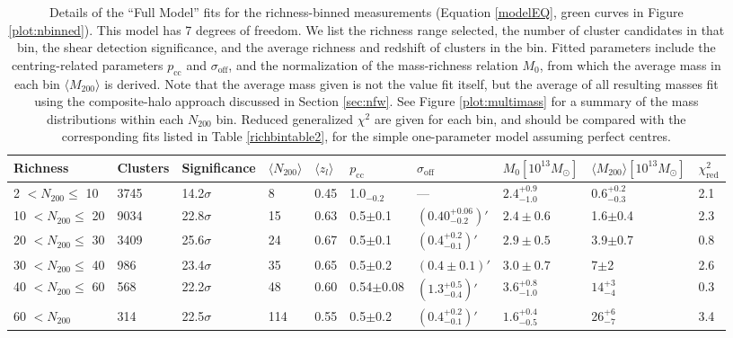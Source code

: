 \begin{landscape}

\begin{table}
\centering
    \caption[Shear Results for Richness-Binned Clusters (Full Model)]{Details of the ``Full Model'' fits for the richness-binned measurements (Equation \ref{modelEQ}, green curves in Figure \ref{plot:nbinned}). This model has 7 degrees of freedom. We list the richness range selected, the number of cluster candidates in that bin, the shear detection significance, and the average richness and redshift of clusters in the bin. Fitted parameters include the centring-related parameters $p_{\mathrm{cc}}$ and $\sigma_{\mathrm{off}}$, and the normalization of the mass-richness relation $M_0$, from which the average mass in each bin $\langle M_{200} \rangle$ is derived. Note that the average mass given is not the value fit itself, but the average of all resulting masses fit using the composite-halo approach discussed in Section \ref{sec:nfw}. See Figure \ref{plot:multimass} for a summary of the mass distributions within each $N_{200}$ bin. Reduced generalized $\chi^2$ are given for each bin, and should be compared with the corresponding fits listed in Table \ref{richbintable2}, for the simple one-parameter model assuming perfect centres.}
    \begin{tabular}{llllllllll}
      \hline
      Richness & Clusters & Significance & $\langle N_{200} \rangle$ & $\langle z_l \rangle$ & $p_{\mathrm{cc}}$ & $\sigma_{\mathrm{off}}$ & $M_0 \left[ 10^{13} M_{\odot}\right]$ & $\langle M_{200} \rangle \left[ 10^{13} M_{\odot}\right]$ & $\chi^2_{\mathrm{red}}$ \\ \hline
      2 $<N_{200}\leq$ 10 & 3745 & 14.2$\sigma$ & 8 & 0.45 & 1.0$_{-0.2}$ & \---- & $2.4^{+0.9}_{-1.0}$ & $0.6^{+0.2}_{-0.3}$ & 2.1  \\
      10 $<N_{200}\leq$ 20 & 9034 & 22.8$\sigma$ & 15 & 0.63 & 0.5$\pm$0.1 & $(0.40^{+0.06}_{-0.2})'$ & $2.4\pm0.6$ & 1.6$\pm$0.4 & 2.3 \\
      20 $<N_{200}\leq$ 30 & 3409 & 25.6$\sigma$ & 24 & 0.67 & 0.5$\pm$0.1 & $(0.4^{+0.2}_{-0.1})'$ & $2.9\pm0.5$ & 3.9$\pm$0.7 & 0.8 \\
      30 $<N_{200}\leq$ 40 & 986 & 23.4$\sigma$ & 35 & 0.65 & 0.5$\pm$0.2 & $(0.4\pm0.1)'$ & $3.0\pm0.7$ & 7$\pm$2 & 2.6 \\
      40 $<N_{200}\leq$ 60 & 568 & 22.2$\sigma$ & 48 & 0.60 & 0.54$\pm$0.08 & $(1.3^{+0.5}_{-0.4})'$ & $3.6^{+0.8}_{-1.0}$ & $14^{+3}_{-4}$ & 0.3 \\
      60 $<N_{200}$ & 314 & 22.5$\sigma$ & 114 & 0.55 & 0.5$\pm$0.2 & $(0.4^{+0.2}_{-0.1})'$ & $1.6^{+0.4}_{-0.5}$ & 26$^{+6}_{-7}$ & 3.4 \\
      \hline
    \end{tabular}
\label{richbintable1}
\end{table}


\end{landscape}
